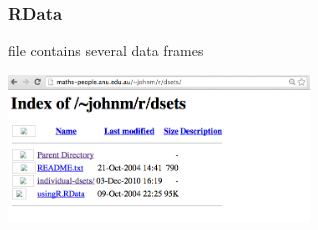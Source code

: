 \documentclass{beamer}\usepackage[]{graphicx}\usepackage[]{color}
\begin{document}

\begin{frame}
\frametitle{RData}

 file  contains several data frames
\begin{center}
\includegraphics[width=8cm]{images/dsets_data.png}
\end{center}

\end{frame}

\end{document}

